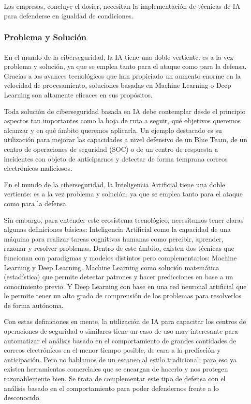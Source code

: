 \documentclass{article}
\begin{document}
Las empresas, concluye el dosier, necesitan la implementación de técnicas de IA para defenderse en igualdad de condiciones.

\subsubsection{Problema y Solución}
\paragraph{}
En el mundo de la ciberseguridad, la IA tiene una doble vertiente: es a la vez problema y solución, ya que se emplea tanto para el ataque como para la defensa. Gracias a los avances tecnológicos que han propiciado un aumento enorme en la velocidad de procesamiento, soluciones basadas en Machine Learning o Deep Learning son altamente eficaces en sus propósitos.

Toda solución de ciberseguridad basada en IA debe contemplar desde el principio aspectos tan importantes como la hoja de ruta a seguir, qué objetivos queremos alcanzar y en qué ámbito queremos aplicarla. Un ejemplo destacado es su utilización para mejorar las capacidades a nivel defensivo de un Blue Team, de un centro de operaciones de seguridad (SOC) o de un centro de respuesta a incidentes con objeto de anticiparnos y detectar de forma temprana correos electrónicos maliciosos.

En el mundo de la ciberseguridad, la Inteligencia Artificial tiene una doble vertiente: es a la vez problema y solución, ya que se emplea tanto para el ataque como para la defensa

Sin embargo, para entender este ecosistema tecnológico, necesitamos tener claras algunas definiciones básicas: Inteligencia Artificial como la capacidad de una máquina para realizar tareas cognitivas humanas como percibir, aprender, razonar y resolver problemas. Dentro de este ámbito, existen dos técnicas que funcionan con paradigmas y modelos distintos pero complementarios: Machine Learning y Deep Learning. Machine Learning como solución matemática (estadística) que permite detectar patrones y hacer predicciones en base a un conocimiento previo. Y Deep Learning con base en una red neuronal artificial que le permite tener un alto grado de comprensión de los problemas para resolverlos de forma autónoma.

Con estas definiciones en mente, la utilización de IA para capacitar los centros de operaciones de seguridad o similares tiene un caso de uso muy interesante para automatizar el análisis basado en el comportamiento de grandes cantidades de correos electrónicos en el menor tiempo posible, de cara a la predicción y anticipación. Pero no hablamos de un escaneo al estilo tradicional; para eso ya existen herramientas comerciales que se encargan de hacerlo y nos protegen razonablemente bien. Se trata de complementar este tipo de defensa con el análisis basado en el comportamiento para poder defendernos frente a lo desconocido.
\end{document}
